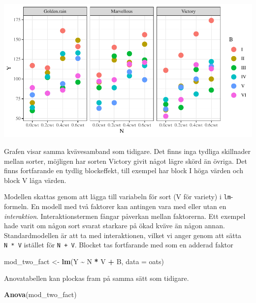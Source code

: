\documentclass[
]{book}
\newenvironment{Shaded}{\begin{snugshade}}{\end{snugshade}}
\newcommand{\AttributeTok}[1]{\textcolor[rgb]{0.13,0.29,0.53}{#1}}
\newcommand{\FunctionTok}[1]{\textcolor[rgb]{0.13,0.29,0.53}{\textbf{#1}}}
\newcommand{\NormalTok}[1]{#1}
\newcommand{\OtherTok}[1]{\textcolor[rgb]{0.56,0.35,0.01}{#1}}
\newcommand{\SpecialCharTok}[1]{\textcolor[rgb]{0.81,0.36,0.00}{\textbf{#1}}}
\theoremstyle{definition}
\theoremstyle{definition}
\theoremstyle{definition}
\theoremstyle{definition}
\theoremstyle{remark}
\begin{document}
\begin{center}\includegraphics{R-anvisningar_files/figure-latex/unnamed-chunk-234-1} \end{center}

Grafen visar samma kvävesamband som tidigare. Det finns inga tydliga skillnader mellan sorter, möjligen har sorten Victory givit något lägre skörd än övriga. Det finns fortfarande en tydlig blockeffekt, till exempel har block I höga värden och block V låga värden.

Modellen skattas genom att lägga till variabeln för sort (V för variety) i \texttt{lm}-formeln. En modell med två faktorer kan antingen vara med eller utan en \emph{interaktion}. Interaktionstermen fångar påverkan mellan faktorerna. Ett exempel hade varit om någon sort svarat starkare på ökad kväve än någon annan. Standardmodellen är att ta med interaktionen, vilket vi anger genom att sätta \texttt{N\ *\ V} istället för \texttt{N\ +\ V}. Blocket tas fortfarande med som en adderad faktor

\begin{Shaded}
\begin{Highlighting}[]
\NormalTok{mod\_two\_fact }\OtherTok{\textless{}{-}} \FunctionTok{lm}\NormalTok{(Y }\SpecialCharTok{\textasciitilde{}}\NormalTok{ N }\SpecialCharTok{*}\NormalTok{ V }\SpecialCharTok{+}\NormalTok{ B, }\AttributeTok{data =}\NormalTok{ oats)}
\end{Highlighting}
\end{Shaded}

Anovatabellen kan plockas fram på samma sätt som tidigare.

\begin{Shaded}
\begin{Highlighting}[]
\FunctionTok{Anova}\NormalTok{(mod\_two\_fact)}
\end{Highlighting}
\end{Shaded}
\end{document}
